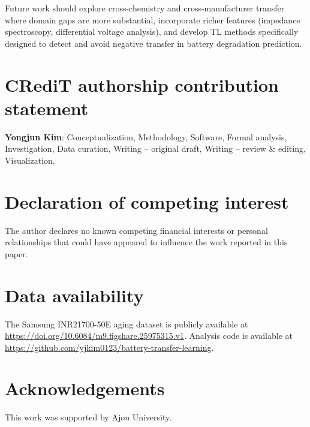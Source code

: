 \documentclass[review]{elsarticle}
\begin{document}
Future work should explore cross-chemistry and cross-manufacturer transfer where domain gaps are more substantial, incorporate richer features (impedance spectroscopy, differential voltage analysis), and develop TL methods specifically designed to detect and avoid negative transfer in battery degradation prediction.

\section*{CRediT authorship contribution statement}

\textbf{Yongjun Kim}: Conceptualization, Methodology, Software, Formal analysis, Investigation, Data curation, Writing -- original draft, Writing -- review \& editing, Visualization.

\section*{Declaration of competing interest}

The author declares no known competing financial interests or personal relationships that could have appeared to influence the work reported in this paper.

\section*{Data availability}

The Samsung INR21700-50E aging dataset is publicly available at \url{https://doi.org/10.6084/m9.figshare.25975315.v1}. Analysis code is available at \url{https://github.com/yjkim0123/battery-transfer-learning}.

\section*{Acknowledgements}

This work was supported by Ajou University.



\end{document}
